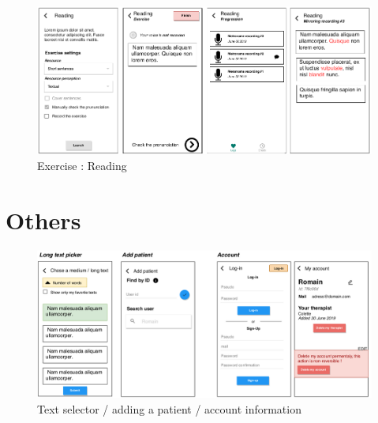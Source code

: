 \begin{appendices}
\begin{figure}[H]
  \includegraphics[width=1\linewidth]{content/imgs/maquette2d.png}
  \caption*{Exercise : Reading}
\end{figure}

\section{Others}
\begin{figure}[H]
  \includegraphics[width=1\linewidth]{content/imgs/maquette3.png}
  \caption*{Text selector / adding a patient / account information}
\end{figure}






\begin{landscape}

\end{landscape}
\end{appendices}
